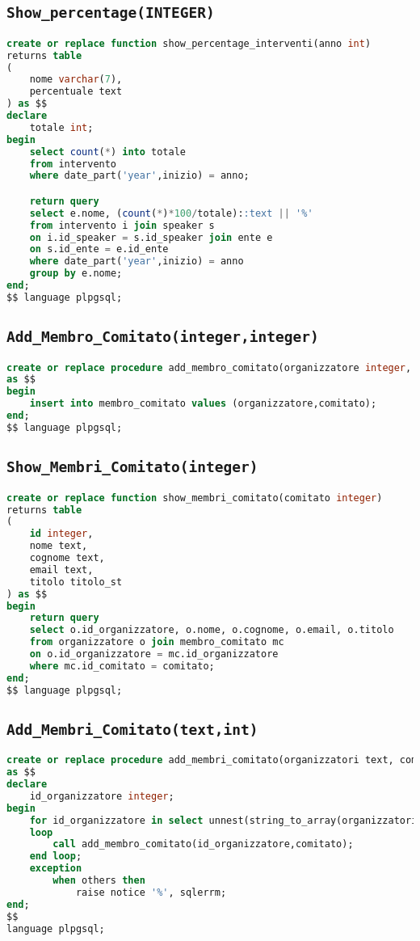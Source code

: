 \subsection{\texttt{Show\_percentage(INTEGER)}}
\begin{lstlisting}[language=SQL,style=mystyle]
create or replace function show_percentage_interventi(anno int)
returns table
(
    nome varchar(7),
    percentuale text
) as $$
declare
    totale int;
begin
    select count(*) into totale
    from intervento
    where date_part('year',inizio) = anno;

    return query
    select e.nome, (count(*)*100/totale)::text || '%'
    from intervento i join speaker s 
    on i.id_speaker = s.id_speaker join ente e 
    on s.id_ente = e.id_ente
    where date_part('year',inizio) = anno
    group by e.nome;
end;
$$ language plpgsql;

\end{lstlisting}
\subsection{\texttt{Add\_Membro\_Comitato(integer,integer)}}
\begin{lstlisting}[language=SQL,style=mystyle]
create or replace procedure add_membro_comitato(organizzatore integer, comitato integer)
as $$
begin
    insert into membro_comitato values (organizzatore,comitato);
end;
$$ language plpgsql;
\end{lstlisting}
\subsection{\texttt{Show\_Membri\_Comitato(integer)}}
\begin{lstlisting}[language=SQL,style=mystyle]
create or replace function show_membri_comitato(comitato integer)
returns table
(
    id integer,
    nome text,
    cognome text,
    email text,
    titolo titolo_st
) as $$
begin
    return query
    select o.id_organizzatore, o.nome, o.cognome, o.email, o.titolo
    from organizzatore o join membro_comitato mc
    on o.id_organizzatore = mc.id_organizzatore
    where mc.id_comitato = comitato;
end;
$$ language plpgsql;
\end{lstlisting}
\subsection{\texttt{Add\_Membri\_Comitato(text,int)}}
\begin{lstlisting}[language=SQL,style=mystyle]
create or replace procedure add_membri_comitato(organizzatori text, comitato integer)
as $$
declare
    id_organizzatore integer;
begin
    for id_organizzatore in select unnest(string_to_array(organizzatori,','))::integer
    loop
        call add_membro_comitato(id_organizzatore,comitato);
    end loop;
    exception
        when others then
            raise notice '%', sqlerrm;
end;
$$
language plpgsql;
\end{lstlisting}